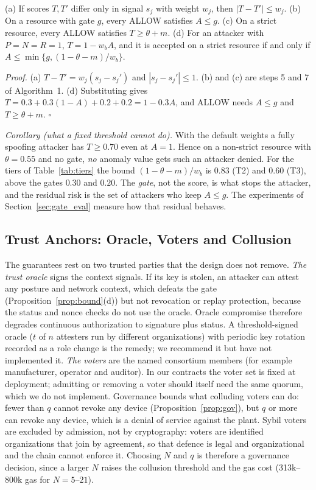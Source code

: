 \begin{proposition}\label{prop:bound}
(a) If scores $T,T'$ differ only in signal $s_j$ with weight $w_j$, then $|T-T'|\le w_j$. (b) On a resource with gate $g$, every ALLOW satisfies $A\le g$. (c) On a strict resource, every ALLOW satisfies $T\ge\theta+m$. (d) For an attacker with $P=N=R=1$, $T=1-w_bA$, and it is accepted on a strict resource if and only if $A\le\min\{g,(1-\theta-m)/w_b\}$.
\end{proposition}
\emph{Proof.} (a) $T-T'=w_j(s_j-s_j')$ and $|s_j-s_j'|\le1$. (b) and (c) are steps 5 and 7 of Algorithm~1. (d) Substituting gives $T=0.3+0.3(1-A)+0.2+0.2=1-0.3A$, and ALLOW needs $A\le g$ and $T\ge\theta+m$. \hfill$\square$

\emph{Corollary (what a fixed threshold cannot do).} With the default weights a fully spoofing attacker has $T\ge0.70$ even at $A=1$. Hence on a non-strict resource with $\theta=0.55$ and no gate, \emph{no} anomaly value gets such an attacker denied. For the tiers of Table~\ref{tab:tiers} the bound $(1-\theta-m)/w_b$ is $0.83$ (T2) and $0.60$ (T3), above the gates $0.30$ and $0.20$. The \emph{gate}, not the score, is what stops the attacker, and the residual risk is the set of attackers who keep $A\le g$. The experiments of Section~\ref{sec:gate_eval} measure how that residual behaves.

\subsection{Trust Anchors: Oracle, Voters and Collusion}\label{sec:anchors}
The guarantees rest on two trusted parties that the design does not remove. \emph{The trust oracle} signs the context signals. If its key is stolen, an attacker can attest any posture and network context, which defeats the gate (Proposition~\ref{prop:bound}(d)) but not revocation or replay protection, because the status and nonce checks do not use the oracle. Oracle compromise therefore degrades continuous authorization to signature plus status. A threshold-signed oracle ($t$ of $n$ attesters run by different organizations) with periodic key rotation recorded as a role change is the remedy; we recommend it but have not implemented it. \emph{The voters} are the named consortium members (for example manufacturer, operator and auditor). In our contracts the voter set is fixed at deployment; admitting or removing a voter should itself need the same quorum, which we do not implement. Governance bounds what colluding voters can do: fewer than $q$ cannot revoke any device (Proposition~\ref{prop:gov}), but $q$ or more can revoke any device, which is a denial of service against the plant. Sybil voters are excluded by admission, not by cryptography: voters are identified organizations that join by agreement, so that defence is legal and organizational and the chain cannot enforce it. Choosing $N$ and $q$ is therefore a governance decision, since a larger $N$ raises the collusion threshold and the gas cost (313k--800k gas for $N=5$--$21$).

